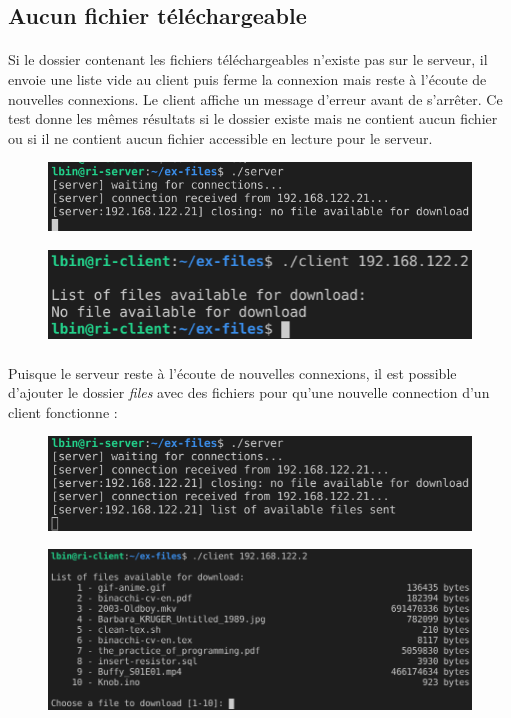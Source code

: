 \documentclass{article}
\begin{document}
    \subsection{Aucun fichier téléchargeable}
    \paragraph{}
    Si le dossier contenant les fichiers téléchargeables n'existe pas sur le serveur, il envoie une liste vide au client puis ferme la connexion mais reste à l'écoute de nouvelles connexions. Le client affiche un message d'erreur avant de s'arrêter. Ce test donne les mêmes résultats si le dossier existe mais ne contient aucun fichier ou si il ne contient aucun fichier accessible en lecture pour le serveur.
    \begin{figure}[H]
        \centering
        \includegraphics[width=.6\textwidth]{./screenshots/test-no-dir-server.png}
    \end{figure}
    \begin{figure}[H]
        \centering
        \includegraphics[width=.45\textwidth]{./screenshots/test-no-dir-client.png}
    \end{figure}

    \paragraph{}
    Puisque le serveur reste à l'écoute de nouvelles connexions, il est possible d'ajouter le dossier \emph{files} avec des fichiers pour qu'une nouvelle connection d'un client fonctionne :
    \begin{figure}[H]
        \centering
        \includegraphics[width=.6\textwidth]{./screenshots/test-add-dir-server.png}
    \end{figure}
    \begin{figure}[H]
        \centering
        \includegraphics[width=.8\textwidth]{./screenshots/test-add-dir-client.png}
    \end{figure}
\end{document}
